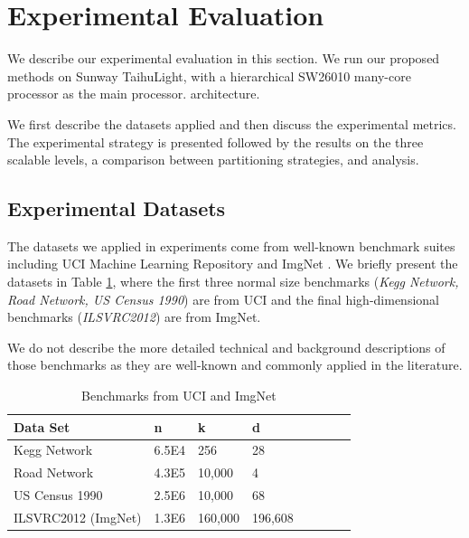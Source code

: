 \documentclass[10pt,journal,compsoc]{IEEEtran}
\begin{document}
\section{Experimental Evaluation}
We describe our experimental evaluation in this section. We run our proposed methods on Sunway TaihuLight, with a hierarchical SW26010 many-core processor as the main processor. architecture. 

We first describe the datasets applied and then discuss the experimental metrics. The experimental strategy is presented followed by the results on the three scalable levels, a comparison between partitioning strategies, and analysis. 


\subsection{Experimental Datasets}
The datasets we applied in experiments come from well-known benchmark suites including UCI Machine Learning Repository\cite{uci} and ImgNet \cite{imgnet}. We briefly present the datasets in Table \ref{t1}, where the first three normal size benchmarks ({\it Kegg Network, Road Network, US Census 1990}) are from UCI and the final high-dimensional benchmarks ({\it ILSVRC2012}) are from ImgNet.

We do not describe the more detailed technical and background descriptions of those benchmarks as they are well-known and commonly applied in the literature. 

\begin{table}
  \caption{Benchmarks from UCI and ImgNet}
  \label{t1}
   \begin{tabular}{p{2.5cm} p{1.5cm} p{1.5cm}p{1.5cm} c c c c}
      \hline
    Data Set &n & k & d\\
       \hline
    Kegg Network &6.5E4 &256 &28  \\
    Road Network &4.3E5 &10,000 &4 \\
    US Census 1990 &2.5E6 &10,000 &68 \\
    \hline
    ILSVRC2012 (ImgNet) &1.3E6 &160,000 &196,608 \\
    \hline
  \end{tabular}
\end{table}
\end{document}
